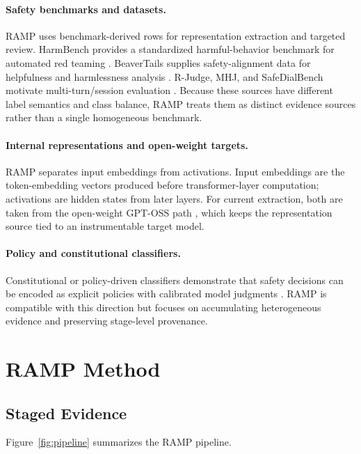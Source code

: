 \documentclass[11pt]{article}
\begin{document}
\paragraph{Safety benchmarks and datasets.}
RAMP uses benchmark-derived rows for representation extraction and targeted review. HarmBench
provides a standardized harmful-behavior benchmark for automated red teaming
\citep{harmbench2024}. BeaverTails supplies safety-alignment data for helpfulness and harmlessness
analysis \citep{beavertails2023}. R-Judge, MHJ, and SafeDialBench motivate multi-turn/session
evaluation \citep{rjudge2024,mhj2024,safedialbench2025}. Because these sources have different label
semantics and class balance, RAMP treats them as distinct evidence sources rather than a single
homogeneous benchmark.

\paragraph{Internal representations and open-weight targets.}
RAMP separates input embeddings from activations. Input embeddings are the token-embedding vectors
produced before transformer-layer computation; activations are hidden states from later layers. For
current extraction, both are taken from the open-weight GPT-OSS path \citep{gptoss2025}, which
keeps the representation source tied to an instrumentable target model.

\paragraph{Policy and constitutional classifiers.}
Constitutional or policy-driven classifiers demonstrate that safety decisions can be encoded as
explicit policies with calibrated model judgments \citep{constitutionalclassifiers2025}. RAMP is
compatible with this direction but focuses on accumulating heterogeneous evidence and preserving
stage-level provenance.

\clearpage

\section{RAMP Method}

\subsection{Staged Evidence}

Figure~\ref{fig:pipeline} summarizes the RAMP pipeline.
\end{document}
